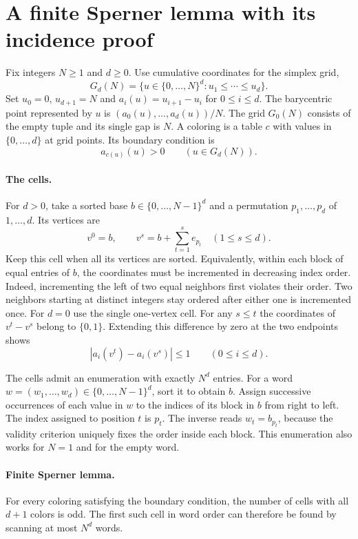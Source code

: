 \section{A finite Sperner lemma with its incidence proof}
\label{sec:finite-sperner}

Fix integers $N\geq 1$ and $d\geq 0$. Use cumulative coordinates for the
simplex grid,
\[
 G_d(N)=\{u\in\{0,\ldots,N\}^d: u_1\leq\cdots\leq u_d\}.
\]
Set $u_0=0$, $u_{d+1}=N$ and $a_i(u)=u_{i+1}-u_i$ for $0\leq i\leq d$.
The barycentric point represented by $u$ is $(a_0(u),\ldots,a_d(u))/N$.
The grid $G_0(N)$ consists of the empty tuple and its single gap is $N$.
A coloring is a table $c$ with values in $\{0,\ldots,d\}$ at grid points.
Its boundary condition is
\[
                       a_{c(u)}(u)>0\qquad(u\in G_d(N)).
\]

\paragraph{The cells.}
For $d>0$, take a sorted base $b\in\{0,\ldots,N-1\}^d$ and a permutation
$p_1,\ldots,p_d$ of $1,\ldots,d$. Its vertices are
\[
        v^0=b,\qquad v^s=b+\sum_{t=1}^s e_{p_t}
                     \quad(1\leq s\leq d).
\]
Keep this cell when all its vertices are sorted. Equivalently, within
each block of equal entries of $b$, the coordinates must be incremented
in decreasing index order. Indeed, incrementing the left of two equal
neighbors first violates their order. Two neighbors starting at distinct
integers stay ordered after either one is incremented once.
For $d=0$ use the single one-vertex cell. For any $s\leq t$ the
coordinates of $v^t-v^s$ belong to $\{0,1\}$. Extending this difference
by zero at the two endpoints shows
\begin{equation}\label{eq:sperner-gap-mesh}
              |a_i(v^t)-a_i(v^s)|\leq 1\qquad(0\leq i\leq d).
\end{equation}

The cells admit an enumeration with exactly $N^d$ entries. For a word
$w=(w_1,\ldots,w_d)\in\{0,\ldots,N-1\}^d$, sort it to obtain $b$.
Assign successive occurrences of each value in $w$ to the indices of its
block in $b$ from right to left. The index assigned to position $t$ is
$p_t$. The inverse reads $w_t=b_{p_t}$, because the validity criterion
uniquely fixes the order inside each block. This enumeration also works
for $N=1$ and for the empty word.

\paragraph{Finite Sperner lemma.}
For every coloring satisfying the boundary condition, the number of
cells with all $d+1$ colors is odd. The first such cell in word order can
therefore be found by scanning at most $N^d$ words.

